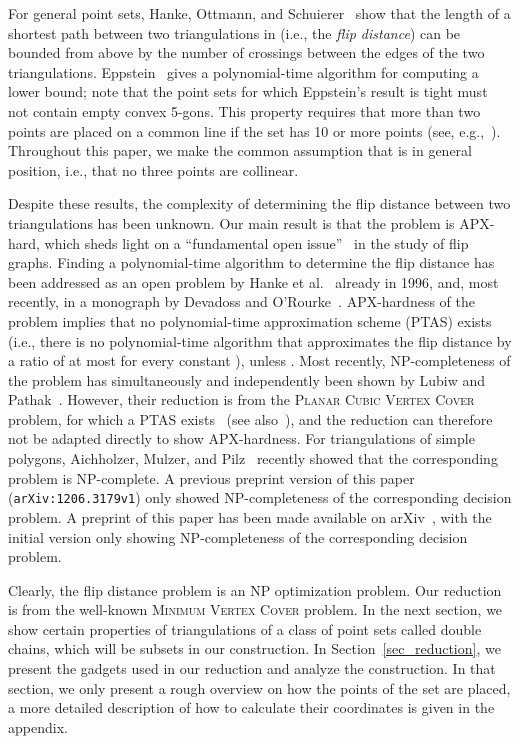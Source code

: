 \documentclass[11pt,a4paper]{article}
\begin{document}
For general point sets, Hanke, Ottmann, and Schuierer~\cite{edge_flipping_distance} show that the length of a shortest path between two triangulations in  (i.e., the \emph{flip distance}) can be bounded from above by the number of crossings between the edges of the two triangulations.
Eppstein~\cite{eppstein} gives a polynomial-time algorithm for computing a lower bound; note that the point sets for which Eppstein's result is tight must not contain empty convex 5-gons.
This property requires that more than two points are placed on a common line if the set has 10 or more points (see, e.g.,~\cite{empty5gon}).
Throughout this paper, we make the common assumption that  is in general position, i.e., that no three points are collinear.

Despite these results, the complexity of determining the flip distance between two triangulations has been unknown.
Our main result is that the problem is APX-hard, which sheds light on a ``fundamental open issue''~\cite{survey} in the study of flip graphs.
Finding a polynomial-time algorithm to determine the flip distance has been addressed as an open problem by Hanke et al.~\cite{edge_flipping_distance} already in 1996, and, most recently, in a monograph by Devadoss and O'Rourke~\cite[p.~71]{devadoss}.
APX-hardness of the problem implies that no polynomial-time approximation scheme (PTAS) exists (i.e., there is no polynomial-time algorithm that approximates the flip distance by a ratio of at most  for every constant ), unless .
Most recently, NP-completeness of the problem has simultaneously and independently been shown by Lubiw and Pathak~\cite{lubiw}.
However, their reduction is from the \textsc{Planar Cubic Vertex Cover} problem, for which a PTAS exists~\cite{planar_ptas, baker_ptas} (see also~\cite[p.~369]{apx_book}), and the reduction can therefore not be adapted directly to show APX-hardness.
For triangulations of simple polygons, Aichholzer, Mulzer, and Pilz~\cite{poly_hard} recently showed that the corresponding problem is NP-complete.
\ifarxiv
A previous preprint version of this paper ({\tt arXiv:1206.3179v1}) only showed NP-completeness of the corresponding decision problem.
\else
A preprint of this paper has been made available on arXiv~\cite{arxiv_version}, with the initial version only showing NP-completeness of the corresponding decision problem.
\fi

Clearly, the flip distance problem is an NP optimization problem.
Our reduction is from the well-known \textsc{Minimum Vertex Cover} problem.
In the next section, we show certain properties of triangulations of a class of point sets called double chains, which will be subsets in our construction.
In Section~\ref{sec_reduction}, we present the gadgets used in our reduction and analyze the construction.
In that section, we only present a rough overview on how the points of the set are placed, a more detailed description of how to calculate their coordinates is given in the appendix.
\end{document}
